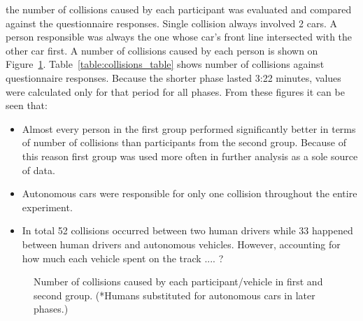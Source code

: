 \documentclass[11pt,english]{article}
\begin{document}
the number of collisions caused by each participant was evaluated and compared against the questionnaire responses. Single collision always involved 2 cars. A person responsible was always the one whose car's front line intersected with the other car first. A number of collisions caused by each person is shown on Figure~\ref{fig:collisions_total}. Table~\ref{table:collisions_table} shows number of collisions against questionnaire responses. Because the shorter phase lasted 3:22 minutes, values were calculated only for that period for all phases. From these figures it can be seen that:
\begin{itemize}
  \item Almost every person in the first group performed significantly better in terms of number of collisions than participants from the second group. Because of this reason first group was used more often in further analysis as a sole source of data.
  \item Autonomous cars were responsible for only one collision throughout the entire experiment. 
  \item  In total 52 collisions occurred between two human drivers while 33 happened between human drivers and autonomous vehicles. However, accounting for how much each vehicle spent on the track .... ?
\end{itemize}











\begin{figure}[h] %
\caption{Number of collisions caused by each participant/vehicle in first and second group. (*Humans substituted for autonomous cars in later phases.)}
\label{fig:collisions_total}
\end{figure}
\end{document}
